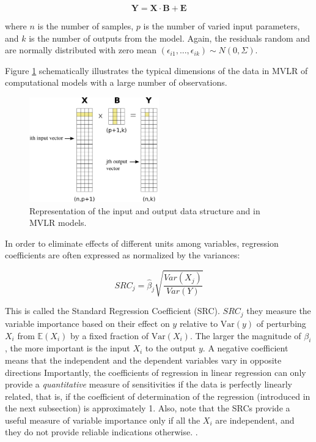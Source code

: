 \documentclass[12pt]{article}
\begin{document}
{\begin{equation} \label{eq:Linear_Regression2}
\mathbf{Y} = \mathbf{X} \cdot \mathbf{B} + \mathbf{E}
\end{equation}

where $n$ is the number of samples, $p$ is the number of varied input parameters, and $k$ is the number of outputs from the model. Again, the residuals random and are normally distributed with zero mean $(\epsilon_{i1}, ..., \epsilon_{ik}) \sim N(0,\Sigma)$.

Figure \ref{fig:Linear_model} schematically illustrates the typical dimensions of the data in MVLR of computational models with a large number of observations.

\begin{figure}[!ht]
	\centering
	\includegraphics[width=0.5\textwidth]{images/Linear_model.png}
	\caption{Representation of the input and output data structure and in MVLR models.}
	\label{fig:Linear_model}
\end{figure}

In order to eliminate effects of different units among variables, regression coefficients are often expressed as normalized by the variances:

\begin{equation}
SRC_{j}=\hat \beta_{j}\sqrt{\frac{Var(X_{j})}{Var(Y)}}
\end{equation}

This is called the Standard Regression Coefficient (SRC). $SRC_{j}$ they measure the variable importance based on their effect on $y$ relative to $\text{Var}(y)$ of perturbing $X_{i}$ from $\mathbb{E}(X_{i})$ by a fixed fraction of $\text{Var}(X_{i})$. The larger the magnitude of $\beta_{i}$,  the more important is the input $X_{i}$ to the output $y$. A negative coefficient means that the independent and the dependent variables vary in opposite directions Importantly, the coefficients of regression in linear regression can only provide a \textit{quantitative} measure of sensitivities if the data is perfectly linearly related, that is, if the coefficient of determination of the regression (introduced in the next subsection) is approximately 1. Also, note that the SRCs provide  a useful measure of variable importance only if all the $X_{i}$ are independent, and they do not provide reliable indications otherwise.
. %

}
\end{document}
